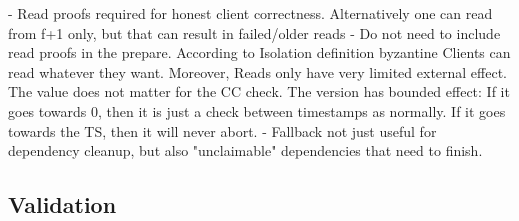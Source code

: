 - Read proofs required for honest client correctness. Alternatively one can read from f+1 only, but that can result in failed/older reads
- Do not need to include read proofs in the prepare. According to Isolation definition byzantine Clients can read whatever they want. Moreover, Reads only have very limited external effect. The value does not matter for the CC check. The version has bounded effect: If it goes towards 0, then it is just a check between timestamps as normally. If it goes towards the TS, then it will never abort.
- Fallback not just useful for dependency cleanup, but also "unclaimable" dependencies that need to finish.
\subsection{Validation}

